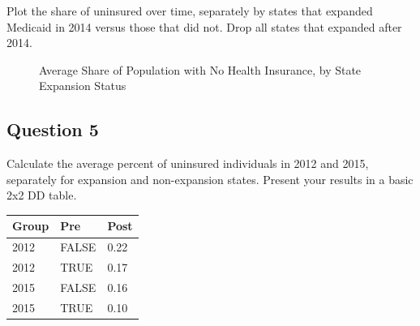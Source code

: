 \documentclass[
]{article}
\begin{document}
Plot the share of uninsured over time, separately by states that
expanded Medicaid in 2014 versus those that did not. Drop all states
that expanded after 2014.

\begin{figure}


\caption{\label{fig-q4}Average Share of Population with No Health
Insurance, by State Expansion Status}

\end{figure}%

\subsection{Question 5}\label{question-5}

Calculate the average percent of uninsured individuals in 2012 and 2015,
separately for expansion and non-expansion states. Present your results
in a basic 2x2 DD table.

\begin{table}[!h]
\centering
\begin{tabular}{lll}
\toprule
Group & Pre & Post\\
\midrule
2012 & FALSE & 0.22\\
2012 & TRUE & 0.17\\
2015 & FALSE & 0.16\\
2015 & TRUE & 0.10\\
\bottomrule
\end{tabular}
\end{table}
\end{document}
